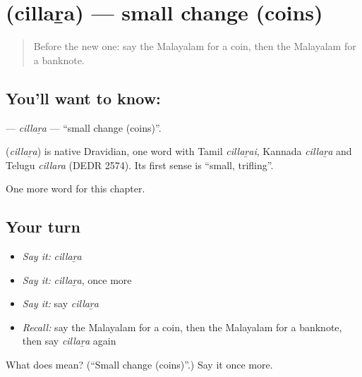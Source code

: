 \section[\texorpdfstring{\ml{ചില്ലറ} (cillaṟa)}{ചില്ലറ (cillaṟa)}]{ (cillaṟa) — small change (coins)}

\label{lesson:ML-C219-cillara}



\begin{quote}
Before the new one: say the Malayalam for a coin, then the Malayalam for a banknote.
\end{quote}

\subsection*{You'll want to know: }
\textbf{} — \emph{cillaṟa} — \textquotedblleft{}small change (coins)\textquotedblright{}.

\begin{cousinweb}
\textbf{} (\emph{cillaṟa}) is native Dravidian, one word with Tamil \emph{cillaṟai}, Kannada \emph{cillaṟa} and Telugu \emph{cillara} (DEDR 2574). Its first sense is \textquotedblleft{}small, trifling\textquotedblright{}.
\end{cousinweb}

\begin{grammarlens}[title={What you've built}]
One more word for this chapter.
\end{grammarlens}

\subsection*{Your turn}
\begin{itemize}
\raggedright
  \item \emph{Say it:} \emph{cillaṟa}
  \item \emph{Say it:} \emph{cillaṟa}, once more
  \item \emph{Say it:} say \emph{cillaṟa}
  \item \emph{Recall:} say the Malayalam for a coin, then the Malayalam for a banknote, then say \emph{cillaṟa} again
\end{itemize}

\begin{tcolorbox}[breakable,colback=teal!4,colframe=teal!35!black,title={Before you move on}]
What does  mean? (\textquotedblleft{}Small change (coins)\textquotedblright{}.) Say it once more.
\end{tcolorbox}
